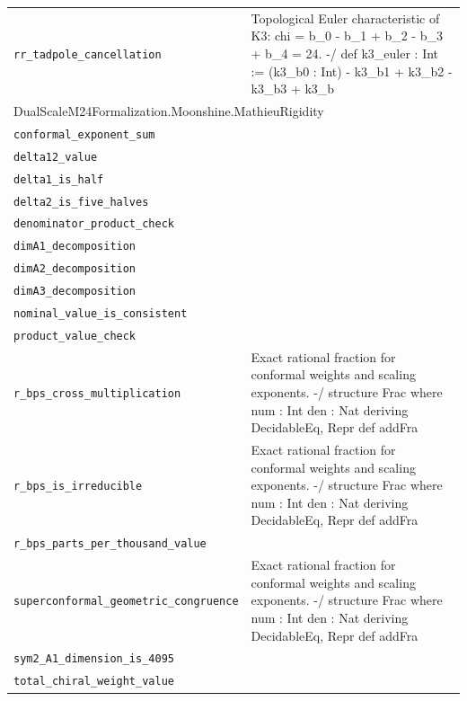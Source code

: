 \begin{longtable}{p{}p{}}
\quad\texttt{\footnotesize rr\_tadpole\_cancellation} & {\footnotesize Topological Euler characteristic of K3:  chi = b\_0 - b\_1 + b\_2 - b\_3 + b\_4 = 24. -/ def k3\_euler : Int := (k3\_b0 : Int) - k3\_b1 + k3\_b2 - k3\_b3 + k3\_b} \\
\multicolumn{2}{l}{\textsf{\small DualScaleM24Formalization.Moonshine.MathieuRigidity}} \\
\quad\texttt{\footnotesize conformal\_exponent\_sum} & {\footnotesize } \\
\quad\texttt{\footnotesize delta12\_value} & {\footnotesize } \\
\quad\texttt{\footnotesize delta1\_is\_half} & {\footnotesize } \\
\quad\texttt{\footnotesize delta2\_is\_five\_halves} & {\footnotesize } \\
\quad\texttt{\footnotesize denominator\_product\_check} & {\footnotesize } \\
\quad\texttt{\footnotesize dimA1\_decomposition} & {\footnotesize } \\
\quad\texttt{\footnotesize dimA2\_decomposition} & {\footnotesize } \\
\quad\texttt{\footnotesize dimA3\_decomposition} & {\footnotesize } \\
\quad\texttt{\footnotesize nominal\_value\_is\_consistent} & {\footnotesize } \\
\quad\texttt{\footnotesize product\_value\_check} & {\footnotesize } \\
\quad\texttt{\footnotesize r\_bps\_cross\_multiplication} & {\footnotesize Exact rational fraction for conformal weights and scaling exponents. -/ structure Frac where num : Int den : Nat deriving DecidableEq, Repr def addFra} \\
\quad\texttt{\footnotesize r\_bps\_is\_irreducible} & {\footnotesize Exact rational fraction for conformal weights and scaling exponents. -/ structure Frac where num : Int den : Nat deriving DecidableEq, Repr def addFra} \\
\quad\texttt{\footnotesize r\_bps\_parts\_per\_thousand\_value} & {\footnotesize } \\
\quad\texttt{\footnotesize superconformal\_geometric\_congruence} & {\footnotesize Exact rational fraction for conformal weights and scaling exponents. -/ structure Frac where num : Int den : Nat deriving DecidableEq, Repr def addFra} \\
\quad\texttt{\footnotesize sym2\_A1\_dimension\_is\_4095} & {\footnotesize } \\
\quad\texttt{\footnotesize total\_chiral\_weight\_value} & {\footnotesize } \\
\end{longtable}
